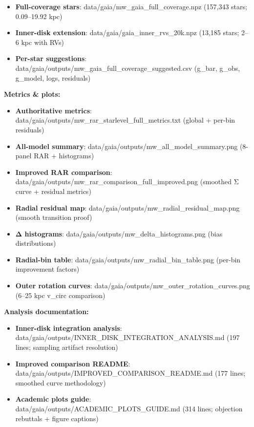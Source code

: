 \documentclass[11pt,a4paper]{article}
\begin{document}
\begin{itemize}
\item \textbf{Full-coverage stars}: data/gaia/mw\_gaia\_full\_coverage.npz (157,343 stars; 0.09–19.92 kpc)
\item \textbf{Inner-disk extension}: data/gaia/gaia\_inner\_rvs\_20k.npz (13,185 stars; 2–6 kpc with RVs)
\item \textbf{Per-star suggestions}: data/gaia/outputs/mw\_gaia\_full\_coverage\_suggested.csv (g\_bar, g\_obs, g\_model, logs, residuals)
\end{itemize}


\textbf{Metrics \& plots:}

\begin{itemize}
\item \textbf{Authoritative metrics}: data/gaia/outputs/mw\_rar\_starlevel\_full\_metrics.txt (global + per-bin residuals)
\item \textbf{All-model summary}: data/gaia/outputs/mw\_all\_model\_summary.png (8-panel RAR + histograms)
\item \textbf{Improved RAR comparison}: data/gaia/outputs/mw\_rar\_comparison\_full\_improved.png (smoothed Σ curve + residual metrics)
\item \textbf{Radial residual map}: data/gaia/outputs/mw\_radial\_residual\_map.png (smooth transition proof)
\item \textbf{Δ histograms}: data/gaia/outputs/mw\_delta\_histograms.png (bias distributions)
\item \textbf{Radial-bin table}: data/gaia/outputs/mw\_radial\_bin\_table.png (per-bin improvement factors)
\item \textbf{Outer rotation curves}: data/gaia/outputs/mw\_outer\_rotation\_curves.png (6–25 kpc v\_circ comparison)
\end{itemize}


\textbf{Analysis documentation:}

\begin{itemize}
\item \textbf{Inner-disk integration analysis}: data/gaia/outputs/INNER\_DISK\_INTEGRATION\_ANALYSIS.md (197 lines; sampling artifact resolution)
\item \textbf{Improved comparison README}: data/gaia/outputs/IMPROVED\_COMPARISON\_README.md (177 lines; smoothed curve methodology)
\item \textbf{Academic plots guide}: data/gaia/outputs/ACADEMIC\_PLOTS\_GUIDE.md (314 lines; objection rebuttals + figure captions)
\end{itemize}
\end{document}
